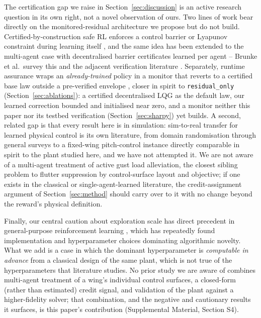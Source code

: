 \documentclass[preprint,11pt]{elsarticle}
\begin{document}
The certification gap we raise in Section~\ref{sec:discussion} is an
active research question in its own right, not a novel observation of
ours. Two lines of work bear directly on the monitored-residual
architecture we propose but do not build. Certified-by-construction safe
RL enforces a control barrier or Lyapunov constraint during learning
itself \cite{chow2018lyapunovsafe,cheng2019cbfsafe,marvi2021cbfsafe}, and
the same idea has been extended to the multi-agent case with
decentralised barrier certificates learned per agent
\cite{qin2021safemarl,gu2023safemarl} -- Brunke et al.\ survey this and
the adjacent verification literature
\cite{brunke2022safelearning,katz2017reluplex,ivanov2019verisig}.
Separately, runtime assurance wraps an \emph{already-trained} policy in a
monitor that reverts to a certified base law outside a pre-verified
envelope \cite{lazarus2020runtimeassurance}, closer in spirit to
\texttt{residual\_only} (Section~\ref{sec:ablations}): a certified
decentralised LQG as the default law, our learned correction bounded and
initialised near zero, and a monitor neither this paper nor its testbed
verification (Section~\ref{sec:sharpy}) yet builds. A second, related gap
is that every result here is in simulation: sim-to-real transfer for
learned physical control is its own literature, from domain randomisation
\cite{tobin2017domainrandomization} through general surveys
\cite{zhao2020sim2realsurvey} to a fixed-wing pitch-control instance
\cite{wada2022sim2realuav} directly comparable in spirit to the plant
studied here, and we have not attempted it. We are not aware of a
multi-agent treatment of active gust load alleviation, the closest sibling
problem to flutter suppression by control-surface layout and objective;
if one exists in the classical or single-agent-learned literature, the
credit-assignment argument of Section~\ref{sec:method} should carry over
to it with no change beyond the reward's physical definition.

Finally, our central caution about exploration scale has direct precedent
in general-purpose reinforcement learning
\cite{henderson2018matters,engstrom2020implementation,andrychowicz2021what,
agarwal2021precipice,yu2022mappo}, which has repeatedly found
implementation and hyperparameter choices dominating algorithmic novelty.
What we add is a case in which the dominant hyperparameter is
\emph{computable in advance} from a classical design of the same plant,
which is not true of the hyperparameters that literature studies. No prior
study we are aware of combines multi-agent treatment of a wing's individual
control surfaces, a closed-form (rather than estimated) credit signal, and
validation of the plant against a higher-fidelity solver; that combination,
and the negative and cautionary results it surfaces, is this paper's
contribution (Supplemental Material, Section S4).
\end{document}
